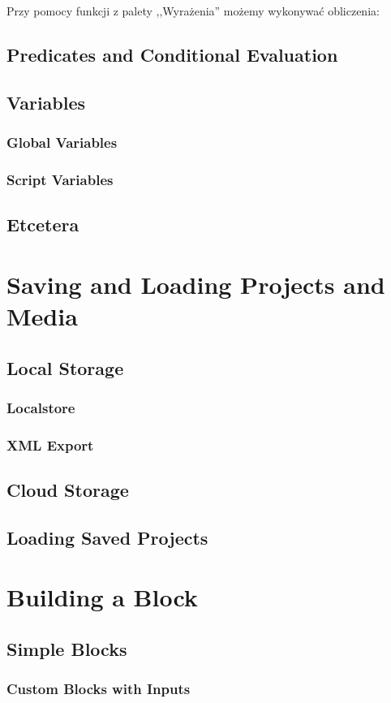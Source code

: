 \documentclass{report}
\begin{document}
Przy pomocy funkcji z palety ,,Wyrażenia'' możemy wykonywać obliczenia:

\section{Predicates and Conditional Evaluation}
\section{Variables}
\subsection{Global Variables}
\subsection{Script Variables}
\section{Etcetera}
\chapter{Saving and Loading Projects and Media}
\section{Local Storage}
\subsection{Localstore}
\subsection{XML Export}
\section{Cloud Storage}
\section{Loading Saved Projects}
\chapter{Building a Block}
\section{Simple Blocks}
\subsection{Custom Blocks with Inputs}
\end{document}

